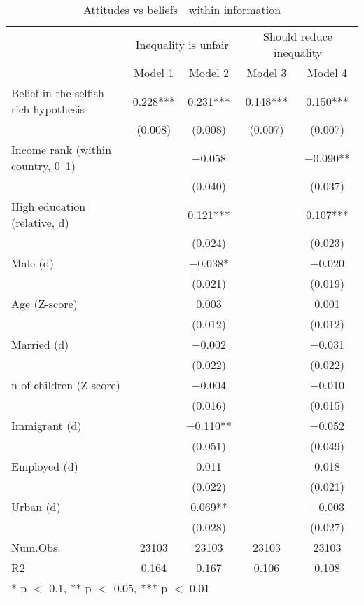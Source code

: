 \begin{table}

\caption{\label{tab:unnamed-chunk-65}Attitudes vs beliefs---within information}
\centering
\begin{tabular}[t]{lcccc}
\toprule
\multicolumn{1}{c}{ } & \multicolumn{2}{c}{Inequality is unfair} & \multicolumn{2}{c}{Should reduce inequality} \\
\cmidrule(l{3pt}r{3pt}){2-3} \cmidrule(l{3pt}r{3pt}){4-5}
  & Model 1 & Model 2 & Model 3 & Model 4\\
\midrule
Belief in the selfish rich hypothesis & \num{0.228}*** & \num{0.231}*** & \num{0.148}*** & \num{0.150}***\\
 & (\num{0.008}) & (\num{0.008}) & (\num{0.007}) & (\num{0.007})\\
Income rank (within country, 0--1) &  & \num{-0.058} &  & \num{-0.090}**\\
 &  & (\num{0.040}) &  & (\num{0.037})\\
High education (relative, d) &  & \num{0.121}*** &  & \num{0.107}***\\
 &  & (\num{0.024}) &  & (\num{0.023})\\
Male (d) &  & \num{-0.038}* &  & \num{-0.020}\\
 &  & (\num{0.021}) &  & (\num{0.019})\\
Age (Z-score) &  & \num{0.003} &  & \num{0.001}\\
 &  & (\num{0.012}) &  & (\num{0.012})\\
Married (d) &  & \num{-0.002} &  & \num{-0.031}\\
 &  & (\num{0.022}) &  & (\num{0.022})\\
n of children (Z-score) &  & \num{-0.004} &  & \num{-0.010}\\
 &  & (\num{0.016}) &  & (\num{0.015})\\
Immigrant (d) &  & \num{-0.110}** &  & \num{-0.052}\\
 &  & (\num{0.051}) &  & (\num{0.049})\\
Employed (d) &  & \num{0.011} &  & \num{0.018}\\
 &  & (\num{0.022}) &  & (\num{0.021})\\
Urban (d) &  & \num{0.069}** &  & \num{-0.003}\\
 &  & (\num{0.028}) &  & (\num{0.027})\\
\midrule
Num.Obs. & \num{23103} & \num{23103} & \num{23103} & \num{23103}\\
R2 & \num{0.164} & \num{0.167} & \num{0.106} & \num{0.108}\\
\bottomrule
\multicolumn{5}{l}{\rule{0pt}{1em}* p $<$ 0.1, ** p $<$ 0.05, *** p $<$ 0.01}\\
\end{tabular}
\end{table}